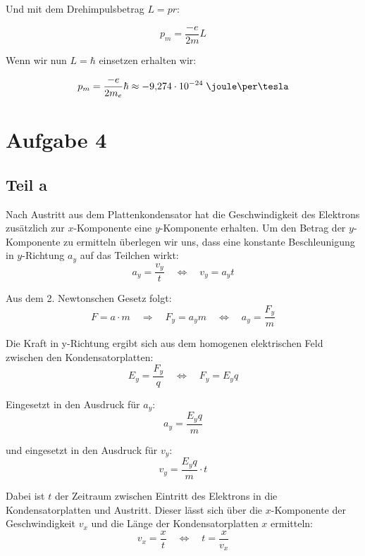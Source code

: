 \documentclass[a4paper,german,12pt,smallheadings]{scrartcl}
\begin{document}
Und mit dem Drehimpulsbetrag $L = pr$:

\begin{equation}
  p_m = \frac{-e}{2m} L
\end{equation}

Wenn wir nun $L = \hbar$ einsetzen erhalten wir:

\begin{equation}
  p_m = \frac{-e}{2m_e} \hbar \approx -9{,}274 \cdot 10^{-24} \;\joule\per\tesla
\end{equation}

\section*{Aufgabe 4}
\subsection*{Teil a}

Nach Austritt aus dem Plattenkondensator hat die Geschwindigkeit des Elektrons
zusätzlich zur $x$-Komponente eine $y$-Komponente erhalten. Um den Betrag der
$y$-Komponente zu ermitteln überlegen wir uns, dass eine konstante Beschleunigung
in $y$-Richtung $a_y$ auf das Teilchen wirkt:
\begin{equation*}
a_y=\frac{v_y}{t} \quad \Leftrightarrow \quad v_y=a_yt
\end{equation*}

Aus dem 2. Newtonschen Gesetz folgt:
\begin{equation*}
F=a \cdot m \quad \Rightarrow \quad F_y=a_ym \quad \Leftrightarrow \quad a_y=\frac{F_y}{m}
\end{equation*}

Die Kraft in y-Richtung ergibt sich aus dem homogenen elektrischen Feld zwischen den Kondensatorplatten:
\begin{equation*}
E_y=\frac{F_y}{q} \quad \Leftrightarrow \quad F_y=E_yq
\end{equation*}

Eingesetzt in den Ausdruck für $a_y$:
\begin{equation*}
a_y=\frac{E_yq}{m}
\end{equation*}

und eingesetzt in den Ausdruck für $v_y$:
\begin{equation*}
v_y=\frac{E_yq}{m} \cdot t
\end{equation*}

Dabei ist $t$ der Zeitraum zwischen Eintritt des Elektrons in die
Kondensatorplatten und Austritt.  Dieser lässt sich über die $x$-Komponente der
Geschwindigkeit $v_x$ und die Länge der Kondensatorplatten $x$ ermitteln:
\begin{equation*}
v_x=\frac{x}{t} \quad \Leftrightarrow \quad t=\frac{x}{v_x}
\end{equation*}
\end{document}
